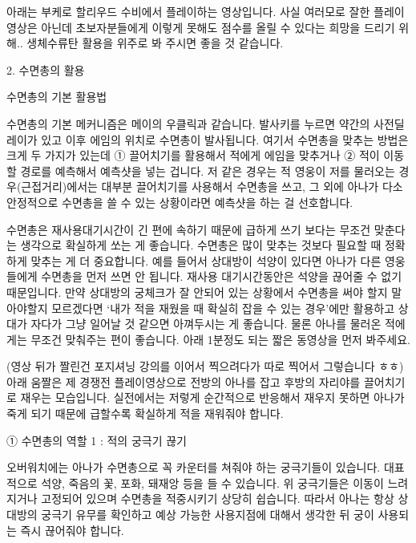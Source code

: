  

아래는 부케로 할리우드 수비에서 플레이하는 영상입니다. 사실 여러모로 잘한 플레이영상은 아닌데 초보자분들에게 이렇게 못해도 점수를 올릴 수 있다는 희망을 드리기 위해.. 생체수류탄 활용을 위주로 봐 주시면 좋을 것 같습니다. 




 

2. 수면총의 활용

 

수면총의 기본 활용법

 

수면총의 기본 메커니즘은 메이의 우클릭과 같습니다. 발사키를 누르면 약간의 사전딜레이가 있고 이후 에임의 위치로 수면총이 발사됩니다. 여기서 수면총을 맞추는 방법은 크게 두 가지가 있는데 ① 끌어치기를 활용해서 적에게 에임을 맞추거나 ② 적이 이동할 경로를 예측해서 예측샷을 넣는 겁니다. 저 같은 경우는 적 영웅이 저를 물러오는 경우(근접거리)에서는 대부분 끌어치기를 사용해서 수면총을 쓰고, 그 외에 아나가 다소 안정적으로 수면총을 쓸 수 있는 상황이라면 예측샷을 하는 걸 선호합니다.

 

수면총은 재사용대기시간이 긴 편에 속하기 때문에 급하게 쓰기 보다는 무조건 맞춘다는 생각으로 확실하게 쏘는 게 좋습니다. 수면총은 많이 맞추는 것보다 필요할 때 정확하게 맞추는 게 더 중요합니다. 예를 들어서 상대방이 석양이 있다면 아나가 다른 영웅들에게 수면총을 먼저 쓰면 안 됩니다. 재사용 대기시간동안은 석양을 끊어줄 수 없기 때문입니다. 만약 상대방의 궁체크가 잘 안되어 있는 상황에서 수면총을 써야 할지 말아야할지 모르겠다면 ‘내가 적을 재웠을 때 확실히 잡을 수 있는 경우’에만 활용하고 상대가 자다가 그냥 일어날 것 같으면 아껴두시는 게 좋습니다. 물론 아나를 물러온 적에게는 무조건 맞춰주는 편이 좋습니다. 아래 1분정도 되는 짧은 동영상을 먼저 봐주세요.

 



(영상 뒤가 짤린건 포지셔닝 강의를 이어서 찍으려다가 따로 찍어서 그렇습니다 ㅎㅎ)
아래 움짤은 제 경쟁전 플레이영상으로 전방의 아나를 잡고 후방의 자리야를 끌어치기로 재우는 모습입니다. 실전에서는 저렇게 순간적으로 반응해서 재우지 못하면 아나가 죽게 되기 때문에 급할수록 확실하게 적을 재워줘야 합니다.




① 수면총의 역할 1 : 적의 궁극기 끊기

 

오버워치에는 아나가 수면총으로 꼭 카운터를 쳐줘야 하는 궁극기들이 있습니다. 대표적으로 석양, 죽음의 꽃, 포화, 돼재앙 등을 들 수 있습니다. 위 궁극기들은 이동이 느려지거나 고정되어 있으며 수면총을 적중시키기 상당히 쉽습니다. 따라서 아나는 항상 상대방의 궁극기 유무를 확인하고 예상 가능한 사용지점에 대해서 생각한 뒤 궁이 사용되는 즉시 끊어줘야 합니다.

